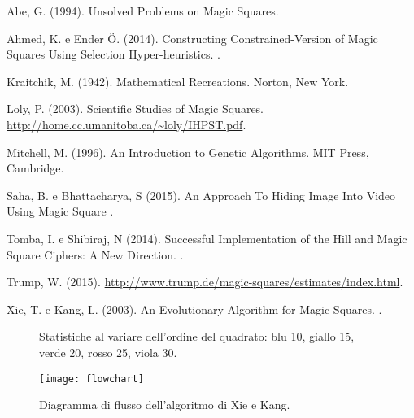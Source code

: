 \documentclass[italian,twoside,twocolumn]{article}
\begin{document}
\begin{thebibliography}{99} 
	
Abe, G. (1994).
\newblock Unsolved Problems on Magic Squares.

Ahmed, K. e Ender Ö. (2014).
\newblock Constructing Constrained-Version of Magic Squares Using Selection Hyper-heuristics.
.

Kraitchik, M. (1942).
\newblock Mathematical Recreations.
\newblock Norton, New York.

Loly, P. (2003).
\newblock Scientific Studies of Magic Squares.
\newblock \url{http://home.cc.umanitoba.ca/~loly/IHPST.pdf}.

Mitchell, M. (1996).
\newblock An Introduction to Genetic Algorithms.
\newblock MIT Press, Cambridge.

Saha, B. e Bhattacharya, S (2015).
\newblock An Approach To Hiding Image Into Video  Using Magic Square
.

Tomba, I. e Shibiraj, N (2014).
\newblock Successful Implementation of the Hill and Magic Square Ciphers: A New Direction.
.

Trump, W. (2015).
\newblock \url{http://www.trump.de/magic-squares/estimates/index.html}.

Xie, T. e Kang, L. (2003).
\newblock An Evolutionary Algorithm for Magic Squares.
.
 
\end{thebibliography}



\onecolumn

\begin{figure}[htbp]
	\centering
	
	\centering
	\caption{Statistiche al variare dell'ordine del quadrato: blu 10, giallo 15, verde 20, rosso 25, viola 30.}
\end{figure}

\begin{figure}[htbp]
	\centering
	\texttt{[image: flowchart]}
	\caption{Diagramma di flusso dell'algoritmo di Xie e Kang.}
	\label{fig:flowchart}
\end{figure}
\end{document}
